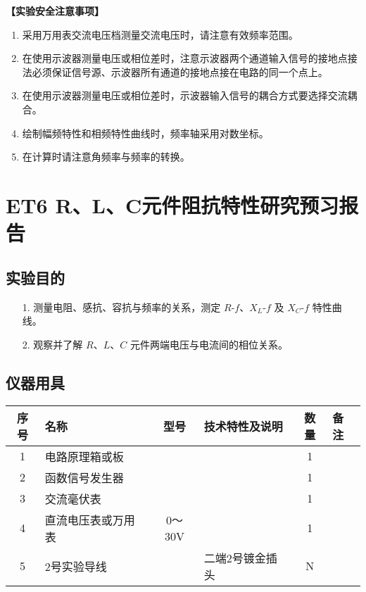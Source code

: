 \documentclass[dvipsnames, svgnames,a4paper,11pt]{article}
\begin{document}
	
	\textbf{【实验安全注意事项】}	
	\begin{enumerate}
		\item 采用万用表交流电压档测量交流电压时，请注意有效频率范围。
		\item 在使用示波器测量电压或相位差时，注意示波器两个通道输入信号的接地点接法必须保证信号源、示波器所有通道的接地点接在电路的同一个点上。
		\item 在使用示波器测量电压或相位差时，示波器输入信号的耦合方式要选择交流耦合。
		\item 绘制幅频特性和相频特性曲线时，频率轴采用对数坐标。
		\item 在计算时请注意角频率与频率的转换。
	\end{enumerate}
	
	\clearpage
	\tableofcontents
	\clearpage
	
	
	
	
	\setcounter{section}{0}
	\section{ET6 R、L、C元件阻抗特性研究\quad\heiti 预习报告}
	
	\subsection{实验目的}
	\begin{enumerate}
		\item[1.] 测量电阻、感抗、容抗与频率的关系，测定 $R$-$f$、$X_L$-$f$ 及 $X_C$-$f$ 特性曲线。
		\item[2.] 观察并了解 $R$、$L$、$C$ 元件两端电压与电流间的相位关系。
	\end{enumerate}
	
	\subsection{仪器用具}
	\begin{table}[htbp]
		\centering
		\renewcommand\arraystretch{1.6}
		\begin{tabular}{|c|p{3cm}|c|p{5cm}|c|p{2cm}|}
			\hline
			序号 & 名称 & 型号 & 技术特性及说明 & 数量 & 备注 \\
			\hline
			1 & 电路原理箱或板 & & & 1 & \\
			2 & 函数信号发生器 & & & 1 & \\
			3 & 交流毫伏表 & & & 1 & \\
			4 & 直流电压表或万用表 & 0～30V & & 1 & \\
			5 & 2号实验导线 & & 二端2号镀金插头 & N & \\
			\hline
		\end{tabular}
	\end{table}
	
\end{document}
